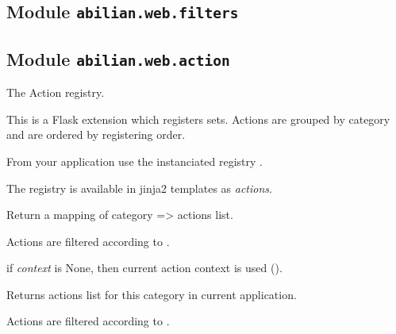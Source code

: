 \documentclass[a4paper,12pt,english]{sphinxmanual}
\begin{document}
\subsection{Module \texttt{abilian.web.filters}}
\label{api:module-abilian-web-filters}

\subsection{Module \texttt{abilian.web.action}}
\label{api:module-abilian.web.action}\label{api:module-abilian-web-action}

\begin{fulllineitems}
\label{api:abilian.web.action.ActionRegistry}
The Action registry.

This is a Flask extension which registers {\hyperref[api:abilian.web.action.Action]{\emph{}}} sets. Actions are
grouped by category and are ordered by registering order.

From your application use the instanciated registry .

The registry is available in jinja2 templates as \emph{actions}.

\begin{fulllineitems}
\label{api:abilian.web.action.ActionRegistry.actions}
Return a mapping of category =\textgreater{} actions list.

Actions are filtered according to {\hyperref[api:abilian.web.action.Action.available]{\emph{}}}.

if \emph{context} is None, then current action context is used
({\hyperref[api:abilian.web.action.ActionRegistry.context]{\emph{}}}).

\end{fulllineitems}


\begin{fulllineitems}
\label{api:abilian.web.action.ActionRegistry.for_category}
Returns actions list for this category in current application.

Actions are filtered according to {\hyperref[api:abilian.web.action.Action.available]{\emph{}}}.


\end{fulllineitems}
\end{fulllineitems}
\end{document}
